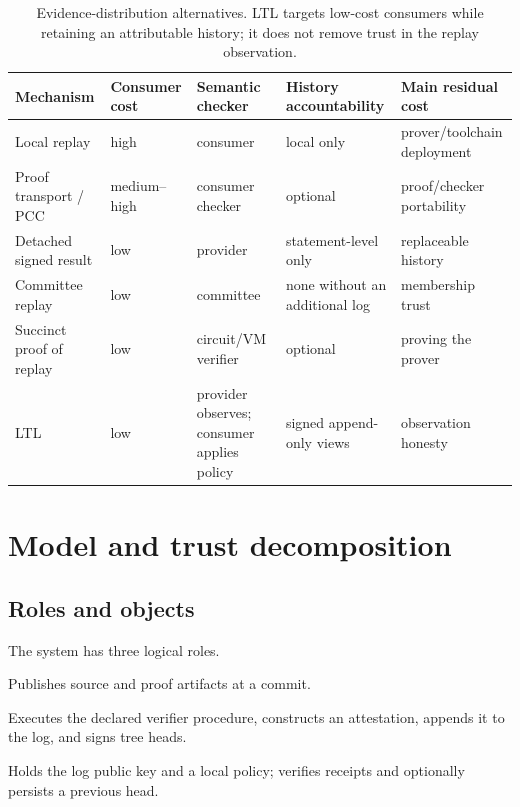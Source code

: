 \documentclass[11pt]{article}
\theoremstyle{remark}
\begin{document}
\begin{table}[t]
\centering\small
\begin{tabularx}{\textwidth}{@{}l>{\raggedright\arraybackslash}X>{\raggedright\arraybackslash}X>{\raggedright\arraybackslash}X>{\raggedright\arraybackslash}X@{}}
\toprule
Mechanism & Consumer cost & Semantic checker & History accountability & Main residual cost \\
\midrule
Local replay & high & consumer & local only & prover/toolchain deployment \\
Proof transport / PCC & medium--high & consumer checker & optional & proof/checker portability \\
Detached signed result & low & provider & statement-level only & replaceable history \\
Committee replay & low & committee & none without an additional log & membership trust \\
Succinct proof of replay & low & circuit/VM verifier & optional & proving the prover \\
LTL & low & provider observes; consumer applies policy & signed append-only views & observation honesty \\
\bottomrule
\end{tabularx}
\caption{Evidence-distribution alternatives. LTL targets low-cost consumers
while retaining an attributable history; it does not remove trust in the
replay observation.}
\label{tab:alternatives}
\end{table}

\section{Model and trust decomposition}\label{sec:model}

\subsection{Roles and objects}

The system has three logical roles.
\begin{description}[leftmargin=1.5em,itemsep=4pt]
\item[Subject maintainer.] Publishes source and proof artifacts at a commit.
\item[Replay operator.] Executes the declared verifier procedure, constructs
an attestation, appends it to the log, and signs tree heads.
\item[Consumer.] Holds the log public key and a local policy; verifies receipts
and optionally persists a previous head.
\end{description}
\end{document}
